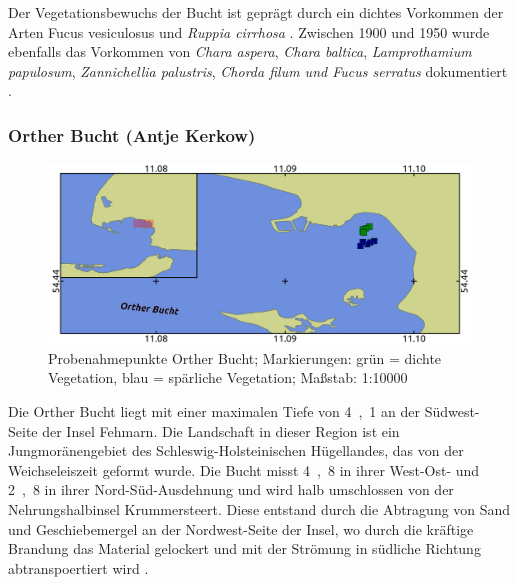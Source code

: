 Der Vegetationsbewuchs der Bucht ist geprägt durch ein dichtes Vorkommen der Arten Fucus vesiculosus und \textit{Ruppia cirrhosa} . Zwischen 1900 und 1950 wurde ebenfalls das Vorkommen von \textit{Chara aspera}, \textit{Chara baltica}, \textit{Lamprothamium papulosum}, \textit{Zannichellia palustris}, \textit{Chorda filum und Fucus serratus} dokumentiert \citep{mertens_2007}.


\subsubsection{Orther Bucht (Antje Kerkow)}

\begin{figure}[htb]
\centering
\includegraphics[width=1\textwidth]{images/OB.png}
\caption[Probenahmepunkte Orther Bucht]{Probenahmepunkte Orther Bucht; Markierungen: grün = dichte Vegetation, blau = spärliche Vegetation; Maßstab: 1:10000}
\label{OB}
\end{figure}



Die Orther Bucht liegt mit einer maximalen Tiefe von \unit{4,1}{\metre} \citep{seekartefehmarnsundkartograph_unbekannt_1902} an der Südwest- Seite der Insel Fehmarn. Die Landschaft in dieser Region ist ein Jungmoränengebiet des Schleswig-Holsteinischen Hügellandes, das von der Weichseleiszeit geformt wurde. Die Bucht misst \unit{4,8}{\kilo\metre} in ihrer West-Ost- und \unit{2,8}{\kilo\metre} in ihrer Nord-Süd-Ausdehnung und wird halb umschlossen von der Nehrungshalbinsel Krummersteert. Diese entstand durch die Abtragung von Sand und Geschiebemergel an der Nordwest-Seite der Insel, wo durch die kräftige Brandung das Material gelockert und mit der Strömung in südliche Richtung abtranspoertiert wird \citep{eschwe_2005}.


